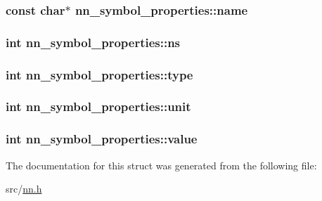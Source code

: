 \subsubsection[{name}]{\setlength{\rightskip}{0pt plus 5cm}const char$\ast$ nn\+\_\+symbol\+\_\+properties\+::name}\hypertarget{structnn__symbol__properties_af0f2469ed20f491bd25e04b3888578a7}{}\label{structnn__symbol__properties_af0f2469ed20f491bd25e04b3888578a7}
\subsubsection[{ns}]{\setlength{\rightskip}{0pt plus 5cm}int nn\+\_\+symbol\+\_\+properties\+::ns}\hypertarget{structnn__symbol__properties_afae5ea3060f71f895430d70cfbed440d}{}\label{structnn__symbol__properties_afae5ea3060f71f895430d70cfbed440d}
\subsubsection[{type}]{\setlength{\rightskip}{0pt plus 5cm}int nn\+\_\+symbol\+\_\+properties\+::type}\hypertarget{structnn__symbol__properties_a79c44b59a88abfb128bb7d8d492d220e}{}\label{structnn__symbol__properties_a79c44b59a88abfb128bb7d8d492d220e}
\subsubsection[{unit}]{\setlength{\rightskip}{0pt plus 5cm}int nn\+\_\+symbol\+\_\+properties\+::unit}\hypertarget{structnn__symbol__properties_a1fcac8f99a526f5be82bc36e848ce3ec}{}\label{structnn__symbol__properties_a1fcac8f99a526f5be82bc36e848ce3ec}
\subsubsection[{value}]{\setlength{\rightskip}{0pt plus 5cm}int nn\+\_\+symbol\+\_\+properties\+::value}\hypertarget{structnn__symbol__properties_a11108a0bae890c4afeeb15eca62fd75d}{}\label{structnn__symbol__properties_a11108a0bae890c4afeeb15eca62fd75d}


The documentation for this struct was generated from the following file\+:\begin{DoxyCompactItemize}
\item 
src/\hyperlink{nn_8h}{nn.\+h}\end{DoxyCompactItemize}
